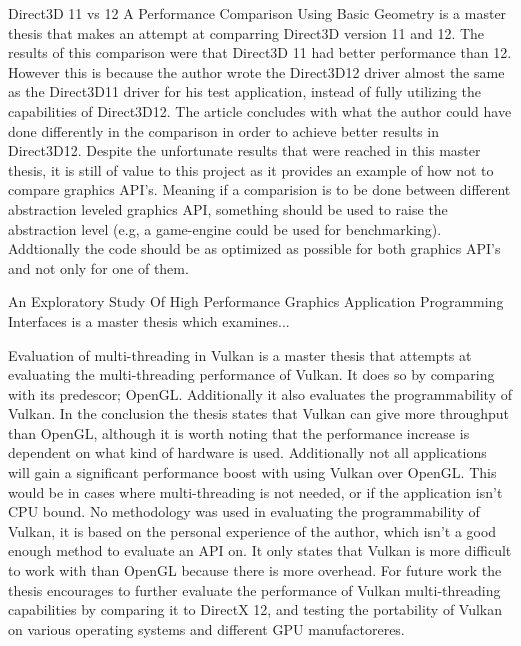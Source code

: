 Direct3D 11 vs 12 A Performance Comparison Using Basic Geometry \cite{2016_direct3d} is a master thesis that makes an attempt at comparring Direct3D version 11 and 12. 
The results of this comparison were that Direct3D 11 had better performance than 12. 
However this is because the author wrote the Direct3D12 driver almost the same as the Direct3D11 driver for his test application, instead of fully utilizing the capabilities of Direct3D12. 
The article concludes with what the author could have done differently in the comparison in order to achieve better results in Direct3D12.
Despite the unfortunate results that were reached in this master thesis, it is still of value to this project as it provides an example of how not to compare graphics API's. 
Meaning if a comparision is to be done between different abstraction leveled graphics API, something should be used to raise the abstraction level  (e.g, a game-engine could be used for benchmarking). 
Addtionally the code should be as optimized as possible for both graphics API's and not only for one of them.

An Exploratory Study Of High Performance Graphics Application Programming Interfaces \cite{2016_exploratory_gpu_api} is a master thesis which examines...

Evaluation of multi-threading in Vulkan \cite{blackert_2016_evaluation} is a master thesis that attempts at evaluating the multi-threading performance of Vulkan. It does so by comparing with its predescor; OpenGL. 
Additionally it also evaluates the programmability of Vulkan. 
In the conclusion the thesis states that Vulkan can give more throughput than OpenGL, although it is worth noting that the performance increase is dependent on what kind of hardware is used. 
Additionally not all applications will gain a significant performance boost with using Vulkan over OpenGL. 
This would be in cases where multi-threading is not needed, or if the application isn't CPU bound.
No methodology was used in evaluating the programmability of Vulkan, it is based on the personal experience of the author, which isn't a good enough method to evaluate an API on. 
It only states that Vulkan is more difficult to work with than OpenGL because there is more overhead. 
For future work the thesis encourages to further evaluate the performance of Vulkan multi-threading  capabilities by comparing it to DirectX 12, and testing the portability of Vulkan on various operating systems and different GPU manufactoreres.